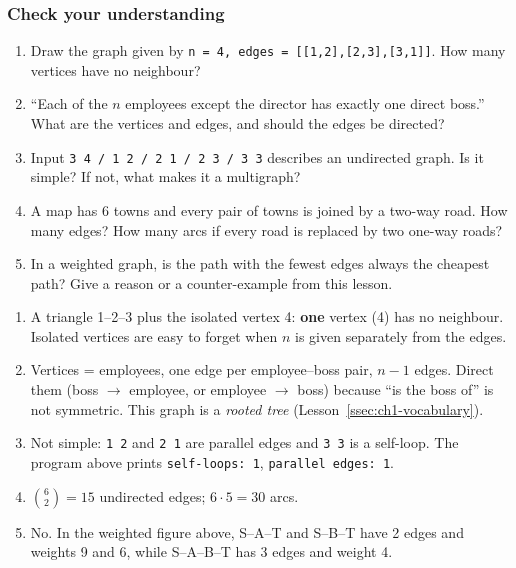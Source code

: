 \subsubsection*{Check your understanding}

\begin{enumerate}[leftmargin=*]
    \item Draw the graph given by \texttt{n = 4, edges = [[1,2],[2,3],[3,1]]}. How many vertices have no neighbour?
    \item ``Each of the $n$ employees except the director has exactly one direct boss.'' What are the vertices and edges, and should the edges be directed?
    \item Input \texttt{3 4 / 1 2 / 2 1 / 2 3 / 3 3} describes an undirected graph. Is it simple? If not, what makes it a multigraph?
    \item A map has 6 towns and every pair of towns is joined by a two-way road. How many edges? How many arcs if every road is replaced by two one-way roads?
    \item In a weighted graph, is the path with the fewest edges always the cheapest path? Give a reason or a counter-example from this lesson.
\end{enumerate}

\begin{solutionbox}[Answers]
\begin{enumerate}[leftmargin=*]
    \item A triangle 1--2--3 plus the isolated vertex 4: \textbf{one} vertex (4) has no neighbour. Isolated vertices are easy to forget when $n$ is given separately from the edges.
    \item Vertices = employees, one edge per employee--boss pair, $n-1$ edges. Direct them (boss $\to$ employee, or employee $\to$ boss) because ``is the boss of'' is not symmetric. This graph is a \emph{rooted tree} (Lesson~\ref{ssec:ch1-vocabulary}).
    \item Not simple: \texttt{1 2} and \texttt{2 1} are parallel edges and \texttt{3 3} is a self-loop. The program above prints \texttt{self-loops: 1}, \texttt{parallel edges: 1}.
    \item $\binom{6}{2}=15$ undirected edges; $6\cdot 5=30$ arcs.
    \item No. In the weighted figure above, S--A--T and S--B--T have 2 edges and weights 9 and 6, while S--A--B--T has 3 edges and weight 4.
\end{enumerate}
\end{solutionbox}
